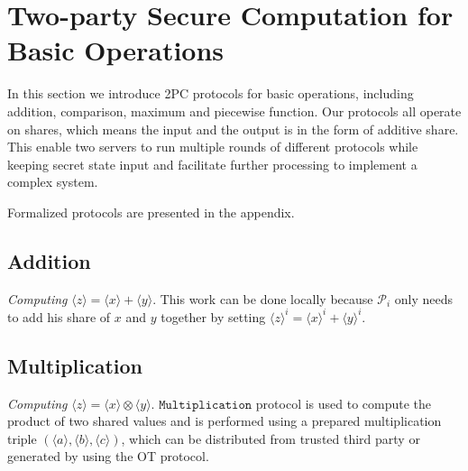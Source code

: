 \documentclass[letterpaper]{article} %
\begin{document}


    \section{Two-party Secure Computation for Basic Operations}

    In this section we introduce 2PC protocols for basic operations,
    including addition, comparison, maximum and piecewise function.
    Our protocols all operate on shares, which means
    the input and the output is in the form of additive share.
    This enable two servers to run multiple rounds of different
    protocols while keeping secret state input
    and facilitate further processing to implement a complex system.

    Formalized protocols are presented in the appendix.

    \subsection{Addition}

    \emph{Computing} $ \langle z\rangle  = \langle x\rangle  + \langle y\rangle $. This work can be done locally because
    $\mathcal{P}_{i}$ only needs to add his share of $x$ and $y$ together by setting $\langle z\rangle^{i}  = \langle x\rangle^{i}  + \langle y\rangle^{i} $.



    \subsection{Multiplication}
    \emph{Computing} $ \langle z\rangle  = \langle x\rangle  \otimes \langle y\rangle $.
    $\mathtt{Multiplication}$ protocol is used to compute the product of two shared values and is performed
    using a prepared multiplication triple $(\langle a\rangle,\langle b\rangle,\langle c\rangle)$,
    which can be distributed from trusted third party or
    generated by using the OT protocol.
\end{document}
